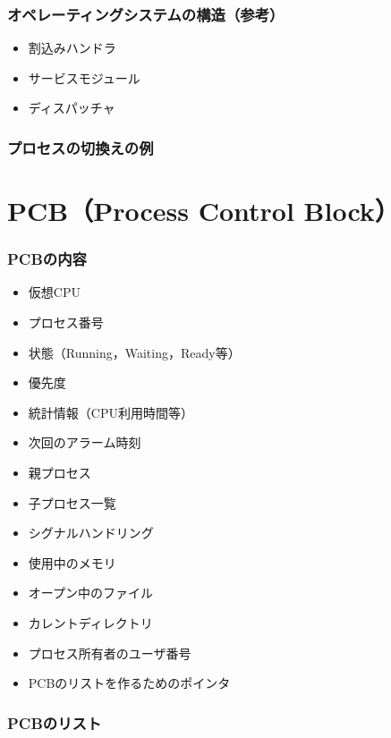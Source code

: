 \documentclass{beamer}                   %
\begin{document}
\begin{frame}
  \frametitle{オペレーティングシステムの構造（参考）}
  \begin{itemize}
    \item 割込みハンドラ
    \item サービスモジュール
    \item ディスパッチャ
  \end{itemize}
\end{frame}

\begin{frame}
  \frametitle{プロセスの切換えの例}
\end{frame}

\section{PCB（Process Control Block）}
\begin{frame}
  \frametitle{PCBの内容}
\begin{itemize}
\item 仮想CPU
\item プロセス番号
\item 状態（Running，Waiting，Ready等）
\item 優先度
\item 統計情報（CPU利用時間等）
\item 次回のアラーム時刻
\item 親プロセス
\item 子プロセス一覧
\item シグナルハンドリング
\item 使用中のメモリ
\item オープン中のファイル
\item カレントディレクトリ
\item プロセス所有者のユーザ番号
\item PCBのリストを作るためのポインタ
\end{itemize}
\end{frame}

\begin{frame}
  \frametitle{PCBのリスト}
\end{frame}
\end{document}
